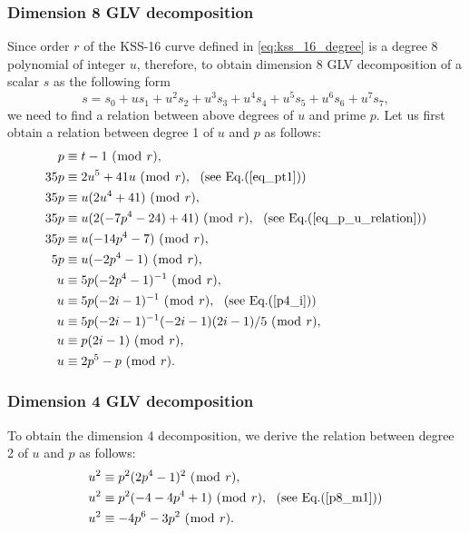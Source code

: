 \subsubsection{Dimension 8 GLV decomposition}
Since order $r$ of  the KSS-16 curve defined in \eqref{eq:kss_16_degree} is a degree 8 polynomial of integer $u$, therefore, to obtain dimension 8 GLV decomposition of a scalar $s$ as the following form
\begin{equation}
 s = s_0 + u s_1 + u^2 s_2 + u^3 s_3 + u^4 s_4 + u^5 s_5 + u^6 s_6 + u^7 s_7, \nonumber
\end{equation}
we need to find a relation between above degrees of $u$ and prime $p$. 
Let us first obtain a relation between degree 1 of $u$ and $p$ as follows:
\begin{alignat}{3}
p &\equiv t-1~(\bmod~r), \nonumber \\
35p &\equiv 2u^5+41u~(\bmod~r), ~~(\text{see~Eq.}(\ref{eq_pt1}))\nonumber \\
35p &\equiv u(2u^4+41)~(\bmod~r), \nonumber \\
35p &\equiv u(2(-7p^4-24)+41)~(\bmod~r), ~~(\text{see~Eq.}(\ref{eq_p_u_relation})) \nonumber \\
35p &\equiv u(-14p^4-7)~(\bmod~r), \nonumber \\
5p &\equiv u(-2p^4-1)~(\bmod~r), \nonumber \\
u &\equiv 5p(-2p^4-1)^{-1}~(\bmod~r), \nonumber \\
u &\equiv 5p(-2i-1)^{-1}~(\bmod~r), ~~(\text{see~Eq.}(\ref{p4_i})) \nonumber \\
u &\equiv 5p(-2i-1)^{-1}(-2i-1)(2i-1)/5~(\bmod~r), \nonumber \\
u &\equiv p(2i-1)~(\bmod~r), \nonumber \\
u &\equiv 2p^5-p~(\bmod~r). \label{equ} 
\end{alignat}

\subsubsection{Dimension 4 GLV decomposition}
To obtain the dimension 4 decomposition, we derive the relation between degree 2 of $u$ and $p$ as follows:
\begin {alignat}{3}
u^2 &\equiv p^2(2p^4-1)^2~(\bmod~r), \nonumber \\
u^2 &\equiv p^2(-4-4p^4+1)~(\bmod~r),  ~~(\text{see~Eq.}(\ref{p8_m1})) \nonumber \\
u^2 &\equiv -4p^6-3p^2~(\bmod~r). \label{equ2}
\end{alignat}


